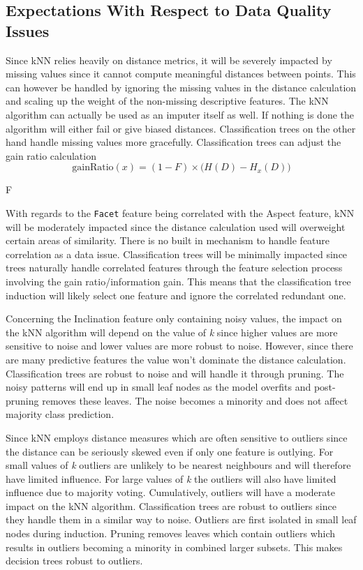 \documentclass[10pt, conference]{IEEEtran}
\begin{document}
\subsection{Expectations With Respect to Data Quality Issues}
Since kNN relies heavily on distance metrics, it will be severely impacted by missing values since it cannot compute meaningful distances between points. This can however be handled by ignoring the missing values in the distance calculation and scaling up the weight of the non-missing descriptive features. The kNN algorithm can actually be used as an imputer itself as well. If nothing is done the algorithm will either fail or give biased distances. Classification trees on the other hand handle missing values more gracefully. Classification trees can adjust the gain ratio calculation 
\[
\text{gainRatio}(x) = (1 - F) \times \big( H(D) - H_x(D) \big)
\]

 F 



With regards to the \texttt{Facet} feature being correlated with the Aspect feature, kNN will be moderately impacted since the distance calculation used will overweight certain areas of similarity. There is no built in mechanism to handle feature correlation as a data issue. Classification trees will be minimally impacted since trees naturally handle correlated features through the feature selection process involving the gain ratio/information gain. This means that the classification tree induction will likely select one feature and ignore the correlated redundant one.

Concerning the Inclination feature only containing noisy values, the impact on the kNN algorithm will depend on the value of \textit{k} since higher values are more sensitive to noise and lower values are more robust to noise. However, since there are many predictive features the value won't dominate the distance calculation. Classification trees are robust to noise and will handle it through pruning. The noisy patterns will end up in small leaf nodes as the model overfits and post-pruning removes these leaves. The noise becomes a minority and does not affect majority class prediction.

Since kNN employs distance measures which are often sensitive to outliers since the distance can be seriously skewed even if only one feature is outlying. For small values of \textit{k} outliers are unlikely to be nearest neighbours and will therefore have limited influence. For large values of \textit{k} the outliers will also have limited influence due to majority voting. Cumulatively, outliers will have a moderate impact on the kNN algorithm. Classification trees are robust to outliers since they handle them in a similar way to noise. Outliers are first isolated in small leaf nodes during induction. Pruning removes leaves which contain outliers which results in outliers becoming a minority in combined larger subsets. This makes decision trees robust to outliers.
\end{document}
